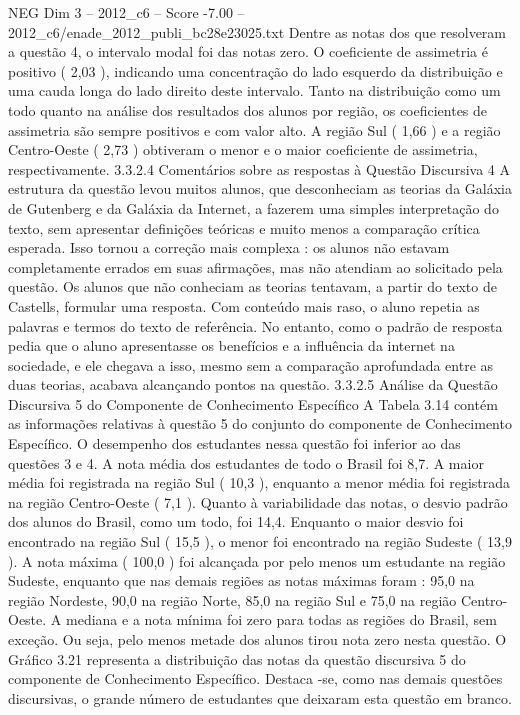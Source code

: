 \begin{textsample}{NEG Dim 3 – 2012\_c6 – Score -7.00 – 2012\_c6/enade\_2012\_publi\_bc28e23025.txt}
Dentre as notas dos que resolveram a questão 4, o intervalo modal foi das notas zero.
O coeficiente de assimetria é positivo ( 2,03 ), indicando uma concentração do lado esquerdo da distribuição e uma cauda longa do lado direito deste intervalo.
Tanto na distribuição como um todo quanto na análise dos resultados dos alunos por região, os coeficientes de assimetria são sempre positivos e com valor alto.
A região Sul ( 1,66 ) e a região Centro-Oeste ( 2,73 ) obtiveram o menor e o maior coeficiente de assimetria, respectivamente. 3.3.2.4 Comentários sobre as respostas à Questão Discursiva 4 A estrutura da questão levou muitos alunos, que desconheciam as teorias da Galáxia de Gutenberg e da Galáxia da Internet, a fazerem uma simples interpretação do texto, sem apresentar definições teóricas e muito menos a comparação crítica esperada.
Isso tornou a correção mais complexa : os alunos não estavam completamente errados em suas afirmações, mas não atendiam ao solicitado pela questão.
Os alunos que não conheciam as teorias tentavam, a partir do texto de Castells, formular uma resposta.
Com conteúdo mais raso, o aluno repetia as palavras e termos do texto de referência.
No entanto, como o padrão de resposta pedia que o aluno apresentasse os benefícios e a influência da internet na sociedade, e ele chegava a isso, mesmo sem a comparação aprofundada entre as duas teorias, acabava alcançando pontos na questão. 3.3.2.5 Análise da Questão Discursiva 5 do Componente de Conhecimento Específico A Tabela 3.14 contém as informações relativas à questão 5 do conjunto do componente de Conhecimento Específico.
O desempenho dos estudantes nessa questão foi inferior ao das questões 3 e 4.
A nota média dos estudantes de todo o Brasil foi 8,7.
A maior média foi registrada na região Sul ( 10,3 ), enquanto a menor média foi registrada na região Centro-Oeste ( 7,1 ).
Quanto à variabilidade das notas, o desvio padrão dos alunos do Brasil, como um todo, foi 14,4.
Enquanto o maior desvio foi encontrado na região Sul ( 15,5 ), o menor foi encontrado na região Sudeste ( 13,9 ).
A nota máxima ( 100,0 ) foi alcançada por pelo menos um estudante na região Sudeste, enquanto que nas demais regiões as notas máximas foram : 95,0 na região Nordeste, 90,0 na região Norte, 85,0 na região Sul e 75,0 na região Centro-Oeste.
A mediana e a nota mínima foi zero para todas as regiões do Brasil, sem exceção.
Ou seja, pelo menos metade dos alunos tirou nota zero nesta questão.
O Gráfico 3.21 representa a distribuição das notas da questão discursiva 5 do componente de Conhecimento Específico.
Destaca -se, como nas demais questões discursivas, o grande número de estudantes que deixaram esta questão em branco.

\end{textsample}
